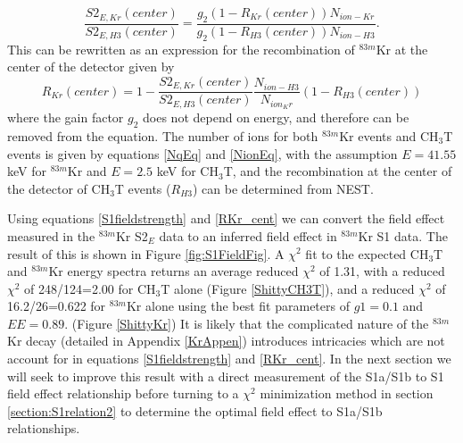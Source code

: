 \documentclass[a4paper,12pt]{article}
\begin{document}
{\begin{equation}
\frac{S2_{E,Kr}(center)}{S2_{E,H3}(center)} = \frac{g_2(1-R_{Kr}(center))N_{ion-Kr}}{g_2(1-R_{H3}(center))N_{ion-H3}}.
\end{equation}
This can be rewritten as an expression for the recombination of $^{83m}$Kr at the center of the detector given by
\begin{equation} \label{RKr_cent}
R_{Kr}(center)=1-\frac{S2_{E,Kr}(center)}{S2_{E,H3}(center)}\frac{N_{ion-H3}}{N_{ion_Kr}}(1-R_{H3}(center))
\end{equation}
where the gain factor $g_2$ does not depend on energy, and therefore can be removed from the equation.  The number of ions for both $^{83m}$Kr events and CH$_3$T events is given by equations \ref{NqEq} and \ref{NionEq}, with the assumption $E=41.55$ keV for $^{83m}$Kr and $E=2.5$ keV for CH$_3$T, and the recombination at the center of the detector of CH$_3$T events ($R_{H3}$) can be determined from NEST.

Using equations \ref{S1fieldstrength} and \ref{RKr_cent} we can convert the field effect measured in the $^{83m}$Kr S2$_E$ data to an inferred field effect in $^{83m}$Kr S1 data.
The result of this is shown in Figure \ref{fig:S1FieldFig}.  A $\chi^2$ fit to the expected CH$_3$T and $^{83m}$Kr energy spectra returns an average reduced $\chi^2$ of 1.31, with a reduced $\chi^2$ of 248/124=2.00 for CH$_3$T alone (Figure \ref{ShittyCH3T}), and a reduced $\chi^2$ of 16.2/26=0.622 for $^{83m}$Kr alone using the best fit parameters of $g1=0.1$ and $EE=0.89$.  (Figure \ref{ShittyKr})  It is likely that the complicated nature of the  $^{83m}$Kr decay (detailed in Appendix \ref{KrAppen}) introduces intricacies which are not account for in equations \ref{S1fieldstrength} and \ref{RKr_cent}.  In the next section we will seek to improve this result with a direct measurement of the S1a/S1b to S1 field effect relationship before turning to a $\chi^2$ minimization method in section \ref{section:S1relation2} to determine the optimal field effect to S1a/S1b relationships.

}
\end{document}
